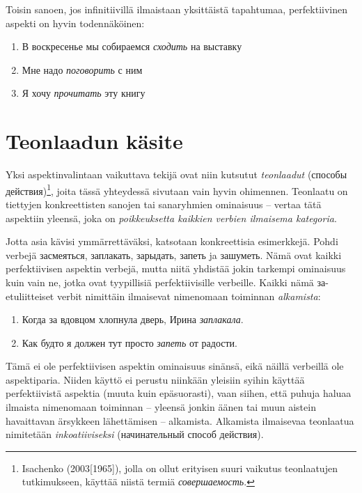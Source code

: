 \documentclass[]{scrreprt}
\providecommand{\tightlist}{%
  \setlength{\itemsep}{0pt}\setlength{\parskip}{0pt}}
\begin{document}
Toisin sanoen, jos infinitiivillä ilmaistaan yksittäistä tapahtumaa,
perfektiivinen aspekti on hyvin todennäköinen:

\begin{enumerate}
\def\labelenumi{(\arabic{enumi})}
\setcounter{enumi}{344}
\tightlist
\item
  В воскресенье мы собираемся \emph{сходить} на выставку
\item
  Мне надо \emph{поговорить} с ним
\item
  Я хочу \emph{прочитать} эту книгу
\end{enumerate}

\section{Teonlaadun käsite}\label{teonlaadun-kuxe4site}

Yksi aspektinvalintaan vaikuttava tekijä ovat niin kutsutut
\emph{teonlaadut} (способы действия)\footnote{Isachenko
  (2003{[}1965{]}), jolla on ollut erityisen suuri vaikutus teonlaatujen
  tutkimukseen, käyttää niistä termiä \emph{совершаемость}.}, joita
tässä yhteydessä sivutaan vain hyvin ohimennen. Teonlaatu on tiettyjen
konkreettisten sanojen tai sanaryhmien ominaisuus -- vertaa tätä
aspektiin yleensä, joka on \emph{poikkeuksetta kaikkien verbien
ilmaisema kategoria}.

Jotta asia kävisi ymmärrettäväksi, katsotaan konkreettisia esimerkkejä.
Pohdi verbejä засмеяться, заплакать, зарыдать, запеть ja зашуметь. Nämä
ovat kaikki perfektiivisen aspektin verbejä, mutta niitä yhdistää jokin
tarkempi ominaisuus kuin vain ne, jotka ovat tyypillisiä
perfektiivisille verbeille. Kaikki nämä за-etuliitteiset verbit
nimittäin ilmaisevat nimenomaan toiminnan \emph{alkamista}:

\begin{enumerate}
\def\labelenumi{(\arabic{enumi})}
\setcounter{enumi}{347}
\tightlist
\item
  Когда за вдовцом хлопнула дверь, Ирина \emph{заплакала}.
\item
  Как будто я должен тут просто \emph{запеть} от радости.
\end{enumerate}

Tämä ei ole perfektiivisen aspektin ominaisuus sinänsä, eikä näillä
verbeillä ole aspektiparia. Niiden käyttö ei perustu niinkään yleisiin
syihin käyttää perfektiivistä aspektia (muuta kuin epäsuorasti), vaan
siihen, että puhuja haluaa ilmaista nimenomaan toiminnan -- yleensä
jonkin äänen tai muun aistein havaittavan ärsykkeen lähettämisen --
alkamista. Alkamista ilmaisevaa teonlaatua nimitetään
\emph{inkoatiiviseksi} (начинательный способ действия).
\end{document}
